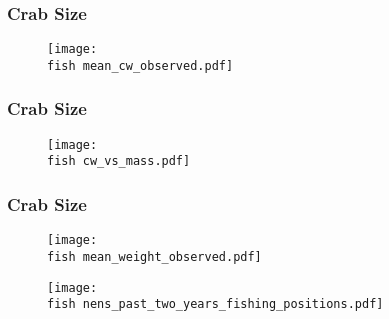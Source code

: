 \documentclass{beamer}
\begin{document}
\begin{frame}
\frametitle{Crab Size}
\begin{figure}

 \vspace*{-.5cm}
 \centerline{\texttt{[image: \\fish mean\_cw\_observed.pdf]}}

 \end{figure}
\end{frame}


\begin{frame}
\frametitle{Crab Size}
\begin{figure}

 \vspace*{-.5cm}
 \centerline{\texttt{[image: \\fish cw\_vs\_mass.pdf]}}

 \end{figure}
\end{frame}


\begin{frame}
\frametitle{Crab Size}
\begin{figure}

 \vspace*{-.5cm}
 \centerline{\texttt{[image: \\fish mean\_weight\_observed.pdf]}}

 \end{figure}
\end{frame}


\begin{frame}
\begin{figure}

 \vspace*{-.3cm}
 \centerline{\texttt{[image: \\fish nens\_past\_two\_years\_fishing\_positions.pdf]}}

 \end{figure}
\end{frame}
\end{document}
